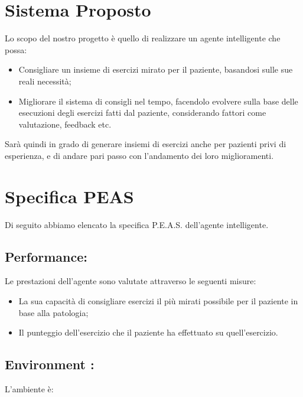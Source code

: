 \documentclass{article}
\begin{document}
    \section{Sistema Proposto}

    Lo scopo del nostro progetto è quello di realizzare un agente intelligente che possa:

    \begin{itemize}
        \item Consigliare un insieme di esercizi mirato per il paziente, basandosi sulle sue reali necessità;
        \item Migliorare il sistema di consigli nel tempo, facendolo evolvere sulla base delle esecuzioni degli esercizi fatti dal paziente, considerando fattori come valutazione, feedback etc.
    \end{itemize}

    Sarà quindi in grado di generare insiemi di esercizi anche per pazienti privi di esperienza, e di andare pari passo con l'andamento dei loro miglioramenti.

    \pagebreak

    \section{Specifica PEAS}

    Di seguito abbiamo elencato la specifica P.E.A.S. dell'agente intelligente.

    \subsection{Performance:}

    Le prestazioni dell’agente sono valutate attraverso le seguenti misure:

    \begin{itemize}
        \item La sua capacità di consigliare esercizi il più mirati possibile per il paziente in base alla patologia;
        \item Il punteggio dell'esercizio che il paziente ha effettuato su quell'esercizio.
    \end{itemize}

    \subsection{Environment :}

    L’ambiente è:
\end{document}
